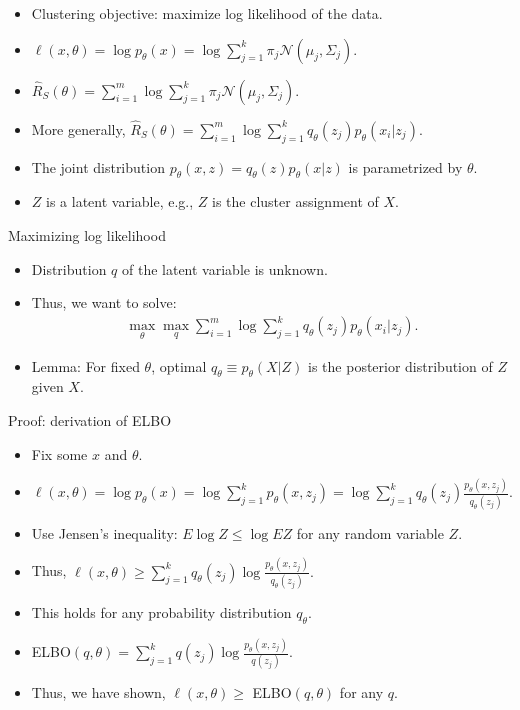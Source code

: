 \documentclass[final]{beamer}
\begin{document}
\begin{frame}
	\begin{itemize}
		\item Clustering objective: maximize log likelihood of the data.
		\pause
		\item $\ell(x, \theta) = \log p_\theta(x) = \log \sum_{j=1}^k \pi_j \mathcal{N}(\mu_j, \Sigma_j).$
		\pause
		\item $\hat{R}_S(\theta) = \sum_{i=1}^m \log \sum_{j=1}^k \pi_j \mathcal{N}(\mu_j, \Sigma_j).$
		\pause
	\item More generally, $\hat{R}_S(\theta) = \sum_{i=1}^m \log \sum_{j=1}^k q_\theta(z_j) p_\theta(x_i | z_j).$
	\pause
	\item The joint distribution $p_\theta(x, z) = q_\theta(z) p_\theta(x | z)$ is parametrized by $\theta.$
	\pause
	\item $Z$ is a latent variable, e.g., $Z$ is the cluster assignment of $X.$
	\end{itemize}
\end{frame}
\begin{frame}{Maximizing log likelihood}
	\begin{itemize}
		\item Distribution $q$ of the latent variable is unknown. 
		\pause
		\item Thus, we want to solve:
			\begin{align}
				\max_\theta \max_q \sum_{i=1}^m \log \sum_{j=1}^k q_\theta(z_j) p_\theta(x_i | z_j).
			\end{align}
		\item Lemma: For fixed $\theta$, optimal $q_\theta \equiv p_\theta(X|Z)$ is the posterior distribution of $Z$ given $X$.
	\end{itemize}
\end{frame}
\begin{frame}{Proof: derivation of ELBO}
\begin{itemize}
	\item Fix some $x$ and $\theta$.
	\pause
	\item $\ell(x,\theta) = \log p_\theta(x) = \log \sum_{j=1}^k p_\theta(x, z_j) = \log \sum_{j=1}^k q_\theta(z_j) \frac{p_\theta(x, z_j)}{q_\theta(z_j)}.$
	\pause
	\item Use Jensen's inequality: $E\log Z \leq \log E Z$ for any random variable $Z.$
	\pause 
\item Thus, $\ell(x, \theta) \geq \sum_{j=1}^k q_\theta(z_j) \log \frac{p_\theta(x, z_j)}{q_\theta(z_j)}.$ 
\pause
\item This holds for any probability distribution $q_\theta$. 
\pause
\item ELBO$(q, \theta) = \sum_{j=1}^k q(z_j) \log \frac{p_\theta(x, z_j)}{q(z_j)}.$
\pause
\item Thus, we have shown, $\ell(x, \theta) \geq$ ELBO$(q, \theta)$ for any $q$.
\end{itemize}
\end{frame}
\end{document}
